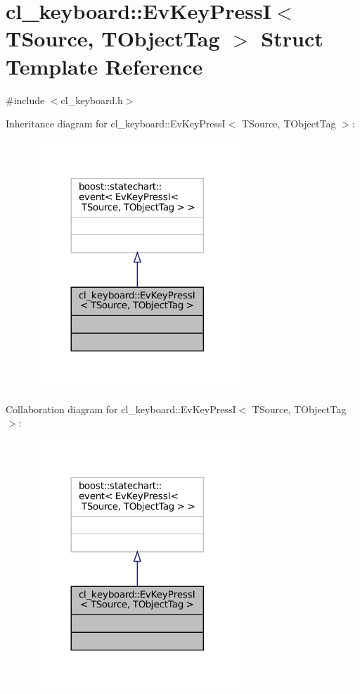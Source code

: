 \hypertarget{structcl__keyboard_1_1EvKeyPressI}{}\section{cl\+\_\+keyboard\+:\+:Ev\+Key\+PressI$<$ T\+Source, T\+Object\+Tag $>$ Struct Template Reference}
\label{structcl__keyboard_1_1EvKeyPressI}


{\ttfamily \#include $<$cl\+\_\+keyboard.\+h$>$}



Inheritance diagram for cl\+\_\+keyboard\+:\+:Ev\+Key\+PressI$<$ T\+Source, T\+Object\+Tag $>$\+:
\nopagebreak
\begin{figure}[H]
\begin{center}
\leavevmode
\includegraphics[width=221pt]{structcl__keyboard_1_1EvKeyPressI__inherit__graph}
\end{center}
\end{figure}


Collaboration diagram for cl\+\_\+keyboard\+:\+:Ev\+Key\+PressI$<$ T\+Source, T\+Object\+Tag $>$\+:
\nopagebreak
\begin{figure}[H]
\begin{center}
\leavevmode
\includegraphics[width=221pt]{structcl__keyboard_1_1EvKeyPressI__coll__graph}
\end{center}
\end{figure}


